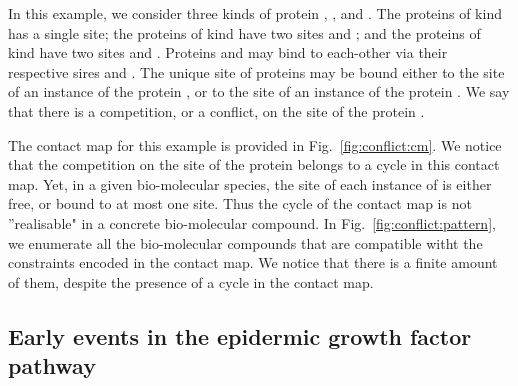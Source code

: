\documentclass{entcs}
\begin{document}
In this example, we consider three kinds of protein , , and . The proteins of kind  has a single site; the proteins of kind  have two sites  and ; and the proteins of kind  have two sites  and . Proteins  and  may bind to each-other via their respective sires  and .
The unique site of proteins  may be bound either to the site  of an instance of the protein , or to the site  of an instance of the protein . We say that there is a competition, or a conflict, on the site of the protein .

The contact map for this example is provided in Fig.~\ref{fig:conflict:cm}.
We notice that the competition on the site of the protein  belongs to a cycle in this contact map. Yet, in a given bio-molecular species,
the site of each instance of  is either free, or bound to at most one site. Thus the cycle of the contact map is not ''realisable"
in a concrete bio-molecular compound. In Fig.~\ref{fig:conflict:pattern}, we enumerate all the bio-molecular compounds that are compatible witht the constraints encoded in the contact map. We notice that there is a finite amount of them, despite the presence of a cycle in the contact map.


\subsection{Early events in the epidermic growth factor pathway}

\label{sec:egfr}
\end{document}

